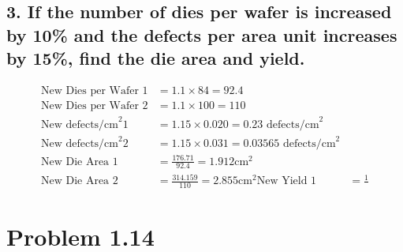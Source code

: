 \documentclass[11pt]{article}
\begin{document}
\subsection*{\small 3. If the number of dies per wafer is increased by 10\% and the defects per area unit increases by 15\%, find the die area and yield.}
\begin{align*}
\textrm{New Dies per Wafer 1} & = 1.1 \times 84 = 92.4\\
\textrm{New Dies per Wafer 2} & = 1.1 \times 100 = 110\\
\textrm{New defects/cm}^2 1 & = 1.15 \times 0.020 = 0.23 \textrm{ defects/cm}^2\\
\textrm{New defects/cm}^2 2 & = 1.15 \times 0.031 = 0.03565 \textrm{ defects/cm}^2\\
\textrm{New Die Area 1} & = \frac{176.71}{92.4} = \boldsymbol{1.912} \textrm{cm}^2\\
\textrm{New Die Area 2} & = \frac{314.159}{110} = \boldsymbol{2.855} \textrm{cm}^2
\textrm{New Yield 1} &= \frac{1}{}
\end{align*}
\section*{Problem 1.14}
\end{document}
